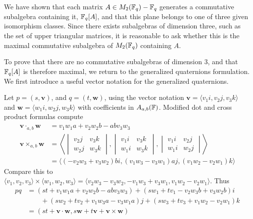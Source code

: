 \documentclass{amsart}
\begin{document}
We have shown that each matrix $A \in M_2(\protect\mathbb{F}_q) - \protect\mathbb{F}_q$ generates a commutative subalgebra containing it, $\protect\mathbb{F}_q[A]$, and that this plane belongs to one of three given isomorphism classes.
Since there exists subalgebras of dimension three, such as the set of upper triangular matrices, it is reasonable to ask whether this is the maximal commutative subalgebra of $M_2(\protect\mathbb{F}_q)$ containing $A$.

To prove that there are no commutative subalgebras of dimension 3, and that $\protect\mathbb{F}_q[A]$ is therefore maximal, we return to the generalized quaternions formulation. We first introduce a useful vector notation for the generalized quaternions.

\begin{defn}
    Let $p = (s, \mathbf{v})$, and $q = (t, \mathbf{w})$, using the vector notation $\mathbf{v} = \langle v_1i, v_2j, v_3k \rangle$ and $\mathbf{w} = \langle w_1i, w_2j, w_3k \rangle$ with coefficients in $A_{a,b}(\protect\mathbb{F})$. Modified dot and cross product formulas compute
    \begin{align*}
        \mathbf{v} \cdot_{a,b}  \mathbf{w} &= v_1w_1a + v_2w_2b -abv_3w_3 \\
        \mathbf{v} \times_{a,b} \mathbf{w} &=
            \left\langle\begin{vmatrix}
                v_2j & v_3k \\
                w_2j & w_3k
            \end{vmatrix},
            \begin{vmatrix}
                v_1i & v_3k \\
                w_1i & w_3k
            \end{vmatrix},
            \begin{vmatrix}
                v_1i & v_2j \\
                w_1i & w_2j
            \end{vmatrix}\right\rangle \\
                                            &= \langle (-v_2w_3 + v_3w_2)bi , (v_1w_3 - v_3w_1)aj, (v_1w_2 - v_2w_1)k \rangle
    \end{align*}
    Compare this to $\langle v_1, v_2, v_3 \rangle \times \langle w_1, w_2, w_3 \rangle = \langle v_2w_3 - v_3w_2, -v_1w_3 + v_3w_1, v_1w_2 - v_2w_1 \rangle$. Thus 
    \begin{align*}
        pq &= (st + v_1w_1a + v_2w_2b -abv_3w_3) + (sw_1 + tv_1 - v_2w_3b + v_3w_2b)i \\
           &\qquad + (sw_2 + tv_2 + v_1w_3a-v_3w_1a)j + (sw_3 + tv_3 + v_1w_2 - v_2w_1)k \\
           &= (st + \mathbf{v} \cdot \mathbf{w}, s\mathbf{w} + t\mathbf{v} + \mathbf{v} \times \mathbf{w})
    \end{align*}
\end{defn}
\end{document}
